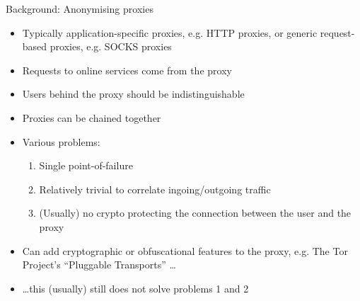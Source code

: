 \documentclass[9pt,a4paper]{beamer}
\begin{document}
\begin{frame}{Background: Anonymising proxies}
  \begin{itemize}
    \item Typically application-specific proxies, e.g. HTTP proxies, or
      generic request-based proxies, e.g. SOCKS proxies
    \item Requests to online services come from the proxy 
    \item Users behind the proxy should be indistinguishable
    \item Proxies can be chained together
    \item Various problems:
      \begin{enumerate}
        \item Single point-of-failure
        \item<2-> Relatively trivial to correlate ingoing/outgoing traffic
        \item<3-> (Usually) no crypto protecting the connection between the user and the proxy
      \end{enumerate}
    \item<4-> Can add cryptographic or obfuscational features to the proxy, e.g. The
      Tor Project's ``Pluggable Transports'' \dots
    \item<5-> \dots this (usually) still does not solve problems 1 and 2
  \end{itemize}

\end{frame}
\end{document}
